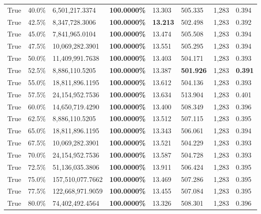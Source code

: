 \begin{table}[H]
\begin{tabular}{lllrllll}
\cline{1-8}
True & 40.0\% & 6,501,217.3374 & \bfseries \color{red} 100.0000\% & 13.303 & 505.335 & 1,283 & 0.394 \\
\cline{1-8}
True & 42.5\% & 8,347,728.3006 & \bfseries \color{red} 100.0000\% & \bfseries \color{red} 13.213 & 502.498 & 1,283 & 0.392 \\
\cline{1-8}
True & 45.0\% & 7,841,965.0104 & \bfseries \color{red} 100.0000\% & 13.474 & 505.508 & 1,283 & 0.394 \\
\cline{1-8}
True & 47.5\% & 10,069,282.3901 & \bfseries \color{red} 100.0000\% & 13.551 & 505.295 & 1,283 & 0.394 \\
\cline{1-8}
True & 50.0\% & 11,409,991.7638 & \bfseries \color{red} 100.0000\% & 13.403 & 504.171 & 1,283 & 0.393 \\
\cline{1-8}
True & 52.5\% & 8,886,110.5205 & \bfseries \color{red} 100.0000\% & 13.387 & \bfseries \color{red} 501.926 & 1,283 & \bfseries \color{red} 0.391 \\
\cline{1-8}
True & 55.0\% & 18,811,896.1195 & \bfseries \color{red} 100.0000\% & 13.612 & 504.136 & 1,283 & 0.393 \\
\cline{1-8}
True & 57.5\% & 24,154,952.7536 & \bfseries \color{red} 100.0000\% & 13.634 & 513.904 & 1,283 & 0.401 \\
\cline{1-8}
True & 60.0\% & 14,650,719.4290 & \bfseries \color{red} 100.0000\% & 13.400 & 508.349 & 1,283 & 0.396 \\
\cline{1-8}
True & 62.5\% & 8,886,110.5205 & \bfseries \color{red} 100.0000\% & 13.512 & 507.115 & 1,283 & 0.395 \\
\cline{1-8}
True & 65.0\% & 18,811,896.1195 & \bfseries \color{red} 100.0000\% & 13.343 & 506.061 & 1,283 & 0.394 \\
\cline{1-8}
True & 67.5\% & 10,069,282.3901 & \bfseries \color{red} 100.0000\% & 13.521 & 504.229 & 1,283 & 0.393 \\
\cline{1-8}
True & 70.0\% & 24,154,952.7536 & \bfseries \color{red} 100.0000\% & 13.587 & 504.728 & 1,283 & 0.393 \\
\cline{1-8}
True & 72.5\% & 51,136,035.3806 & \bfseries \color{red} 100.0000\% & 13.911 & 506.424 & 1,283 & 0.395 \\
\cline{1-8}
True & 75.0\% & 157,510,077.7662 & \bfseries \color{red} 100.0000\% & 13.469 & 507.286 & 1,283 & 0.395 \\
\cline{1-8}
True & 77.5\% & 122,668,971.9059 & \bfseries \color{red} 100.0000\% & 13.455 & 507.084 & 1,283 & 0.395 \\
\cline{1-8}
True & 80.0\% & 74,402,492.4564 & \bfseries \color{red} 100.0000\% & 13.326 & 508.301 & 1,283 & 0.396 \\

\end{tabular}
\end{table}
